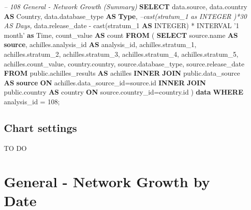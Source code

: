\documentclass[]{book}
\newenvironment{Shaded}{\begin{snugshade}}{\end{snugshade}}
\newcommand{\KeywordTok}[1]{\textcolor[rgb]{0.13,0.29,0.53}{\textbf{#1}}}
\newcommand{\DataTypeTok}[1]{\textcolor[rgb]{0.13,0.29,0.53}{#1}}
\newcommand{\DecValTok}[1]{\textcolor[rgb]{0.00,0.00,0.81}{#1}}
\newcommand{\StringTok}[1]{\textcolor[rgb]{0.31,0.60,0.02}{#1}}
\newcommand{\CommentTok}[1]{\textcolor[rgb]{0.56,0.35,0.01}{\textit{#1}}}
\newcommand{\FunctionTok}[1]{\textcolor[rgb]{0.00,0.00,0.00}{#1}}
\newcommand{\NormalTok}[1]{#1}
\begin{document}
\begin{Shaded}
\begin{Highlighting}[]
\CommentTok{-- 108    General - Network Growth (Summary)}
\KeywordTok{SELECT}\NormalTok{ data.source,}
\NormalTok{       data.country }\KeywordTok{AS}\NormalTok{ Country,}
\NormalTok{       data.database_type }\KeywordTok{AS} \KeywordTok{Type}\NormalTok{,}
       \CommentTok{--cast(stratum_1 as INTEGER )*30 AS Days,}
\NormalTok{       data.release_date - }\FunctionTok{cast}\NormalTok{(stratum_1 }\KeywordTok{AS} \DataTypeTok{INTEGER}\NormalTok{) * }
       \DataTypeTok{INTERVAL} \StringTok{'1 month'} \KeywordTok{as} \DataTypeTok{Time}\NormalTok{,}
\NormalTok{       count_value                   }\KeywordTok{AS} \FunctionTok{count}
\KeywordTok{FROM}\NormalTok{ (}
     \KeywordTok{SELECT}\NormalTok{ source.name              }\KeywordTok{AS} \KeywordTok{source}\NormalTok{,}
\NormalTok{            achilles.analysis_id     }\KeywordTok{AS}\NormalTok{ analysis_id,}
\NormalTok{            achilles.stratum_1,}
\NormalTok{            achilles.stratum_2,}
\NormalTok{            achilles.stratum_3,}
\NormalTok{            achilles.stratum_4,}
\NormalTok{            achilles.stratum_5,}
\NormalTok{            achilles.count_value,}
\NormalTok{            country.country,}
\NormalTok{            source.database_type, }
\NormalTok{            source.release_date}
     \KeywordTok{FROM}\NormalTok{ public.achilles_results }\KeywordTok{AS}\NormalTok{ achilles }\KeywordTok{INNER} \KeywordTok{JOIN} 
\NormalTok{        public.data_source }\KeywordTok{AS} \KeywordTok{source} \KeywordTok{ON}
\NormalTok{        achilles.data_source_id=source.id}
     \KeywordTok{INNER} \KeywordTok{JOIN}\NormalTok{ public.country }\KeywordTok{AS}\NormalTok{ country }\KeywordTok{ON} 
\NormalTok{        source.country_id=country.id}
\NormalTok{     ) }\KeywordTok{data}
\KeywordTok{WHERE}\NormalTok{ analysis_id = }\DecValTok{108}\NormalTok{;}
\end{Highlighting}
\end{Shaded}

\subsection{Chart settings}\label{chart-settings-3}

TO DO

\section{General - Network Growth by
Date}\label{general---network-growth-by-date}
\end{document}
